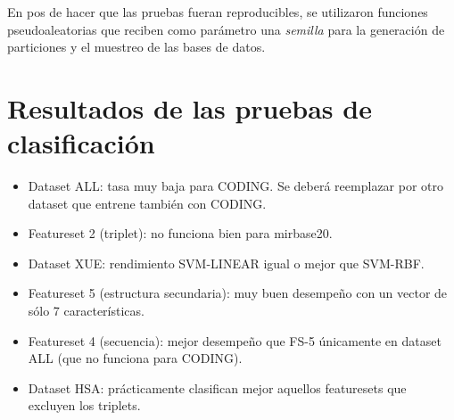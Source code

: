 \documentclass[12pt,bibliography=oldstyle,DIV=12,parskip=half-,titlepage]{scrartcl}
\begin{document}
En pos de hacer que las pruebas fueran reproducibles, se utilizaron funciones pseudoaleatorias
que reciben como parámetro una \emph{semilla} para la generación de particiones
y el muestreo de las bases de datos. 


\section{Resultados de las pruebas de clasificación}
\begin{itemize}
\item Dataset ALL: tasa muy baja para CODING. Se deberá reemplazar por otro dataset que entrene también con CODING.
\item Featureset 2 (triplet): no funciona bien para mirbase20.
\item Dataset XUE: rendimiento SVM-LINEAR igual o mejor que SVM-RBF.
\item Featureset 5 (estructura secundaria): muy buen desempeño con un vector de sólo 7 características.
\item Featureset 4 (secuencia): mejor desempeño que FS-5 únicamente en dataset ALL (que no funciona para CODING).
\item Dataset HSA: prácticamente clasifican mejor aquellos featuresets que excluyen los triplets.
\end{itemize}

\renewcommand{\bibfont}{\normalfont\footnotesize}
\printbibliography
\end{document}
